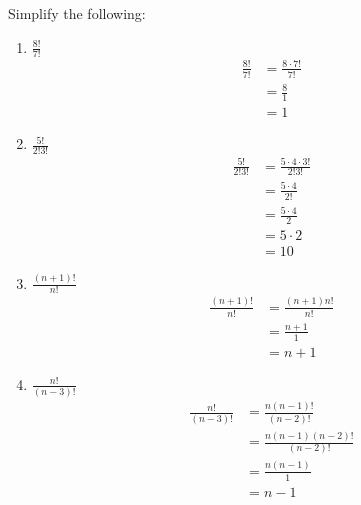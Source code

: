 \guard




\begin{exmp}
\label{exmp:computeFactorials}
  Simplify the following:
  \begin{enumerate}
    \item $\frac{8!}{7!}$
      \begin{align*}
        \frac{8!}{7!} &= \frac{8\cdot 7!}{7!} \\
                      &= \frac{8}{1} \\
                      &= 1
      \end{align*}
    \item $\frac{5!}{2!3!}$
      \begin{align*}
        \frac{5!}{2!3!} &= \frac{5\cdot 4\cdot 3!}{2!3!} \\
                        &= \frac{5\cdot 4}{2!} \\
                        &= \frac{5\cdot 4}{2} \\
                        &= 5\cdot 2 \\
                        &= 10
      \end{align*}
    \item $\frac{(n+1)!}{n!}$
      \begin{align*}
        \frac{(n+1)!}{n!} &= \frac{(n+1)n!}{n!} \\
                          &= \frac{n+1}{1} \\
                          &= n+1
      \end{align*}
    \item $\frac{n!}{(n-3)!}$
      \begin{align*}
        \frac{n!}{(n-3)!} &= \frac{n(n-1)!}{(n-2)!} \\
                          &= \frac{n(n-1)(n-2)!}{(n-2)!} \\
                          &= \frac{n(n-1)}{1} \\
                          &= n-1
      \end{align*}
  \end{enumerate}
\end{exmp}
